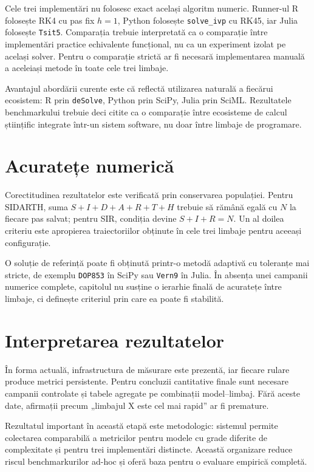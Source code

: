 Cele trei implementări nu folosesc exact același algoritm numeric. Runner-ul R
folosește RK4 cu pas fix $h=1$, Python folosește \texttt{solve\_ivp} cu RK45, iar
Julia folosește \texttt{Tsit5}. Comparația trebuie interpretată ca o comparație
între implementări practice echivalente funcțional, nu ca un experiment izolat pe
același solver. Pentru o comparație strictă ar fi necesară implementarea manuală a
aceleiași metode în toate cele trei limbaje.

Avantajul abordării curente este că reflectă utilizarea naturală a fiecărui
ecosistem: R prin \texttt{deSolve}, Python prin SciPy, Julia prin SciML. Rezultatele
benchmarkului trebuie deci citite ca o comparație între ecosisteme de calcul
științific integrate într-un sistem software, nu doar între limbaje de programare.

\section{Acuratețe numerică}
\label{sec:acuratete}

Corectitudinea rezultatelor este verificată prin conservarea populației. Pentru
SIDARTH, suma $S+I+D+A+R+T+H$ trebuie să rămână egală cu $N$ la fiecare pas salvat;
pentru SIR, condiția devine $S+I+R=N$. Un al doilea criteriu este apropierea
traiectoriilor obținute în cele trei limbaje pentru aceeași configurație.

O soluție de referință poate fi obținută printr-o metodă adaptivă cu toleranțe mai
stricte, de exemplu \texttt{DOP853} în SciPy sau \texttt{Vern9} în Julia. În
absența unei campanii numerice complete, capitolul nu susține o ierarhie finală de
acuratețe între limbaje, ci definește criteriul prin care ea poate fi stabilită.

\section{Interpretarea rezultatelor}
\label{sec:analiza_sintetica}

În forma actuală, infrastructura de măsurare este prezentă, iar fiecare rulare
produce metrici persistente. Pentru concluzii cantitative finale sunt necesare
campanii controlate și tabele agregate pe combinații model--limbaj. Fără aceste
date, afirmații precum „limbajul X este cel mai rapid” ar fi premature.

Rezultatul important în această etapă este metodologic: sistemul permite colectarea
comparabilă a metricilor pentru modele cu grade diferite de complexitate și pentru
trei implementări distincte. Această organizare reduce riscul benchmarkurilor
ad-hoc și oferă baza pentru o evaluare empirică completă.
